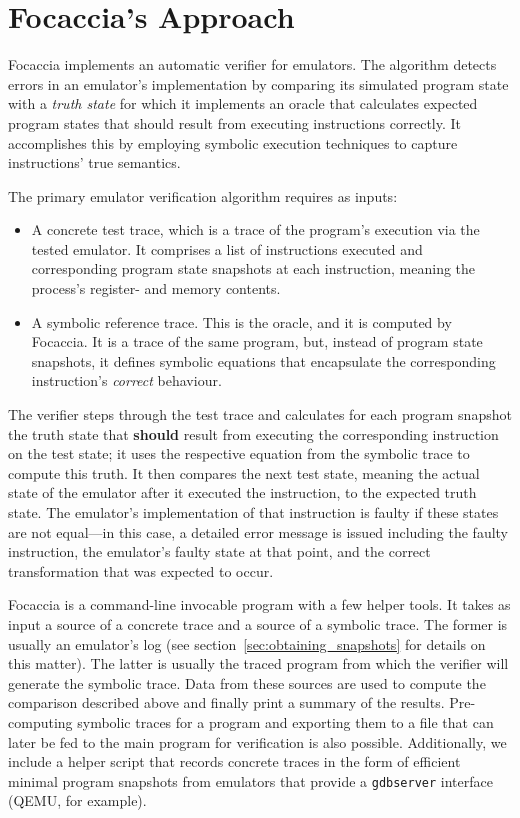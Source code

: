 \section{Focaccia's Approach}

Focaccia implements an automatic verifier for emulators. The algorithm detects errors in an emulator's implementation by
comparing its simulated program state with a \textit{truth state} for which it implements an oracle that calculates
expected program states that should result from executing instructions correctly. It accomplishes this by employing
symbolic execution techniques to capture instructions' true semantics.

The primary emulator verification algorithm requires as inputs:

\begin{itemize}
    \item A concrete test trace, which is a trace of the program's execution via the tested emulator. It comprises a
        list of instructions executed and corresponding program state snapshots at each instruction, meaning the
        process's register- and memory contents.
    \item A symbolic reference trace. This is the oracle, and it is computed by Focaccia. It is a trace of the same
        program, but, instead of program state snapshots, it defines symbolic equations that encapsulate the
        corresponding instruction's \textit{correct} behaviour.
\end{itemize}

The verifier steps through the test trace and calculates for each program snapshot the truth state that \textbf{should}
result from executing the corresponding instruction on the test state; it uses the respective equation from the symbolic
trace to compute this truth. It then compares the next test state, meaning the actual state of the emulator after it
executed the instruction, to the expected truth state. The emulator's implementation of that instruction is faulty if
these states are not equal---in this case, a detailed error message is issued including the faulty instruction, the
emulator's faulty state at that point, and the correct transformation that was expected to occur.

Focaccia is a command-line invocable program with a few helper tools. It takes as input a source of a concrete trace and
a source of a symbolic trace. The former is usually an emulator's log (see section~\ref{sec:obtaining_snapshots} for
details on this matter). The latter is usually the traced program from which the verifier will generate the symbolic
trace. Data from these sources are used to compute the comparison described above and finally print a summary of the
results. Pre-computing symbolic traces for a program and exporting them to a file that can later be fed to the main
program for verification is also possible. Additionally, we include a helper script that records concrete traces in the
form of efficient minimal program snapshots from emulators that provide a \texttt{gdbserver}
interface~\cite{Sourceware2024GdbRemoteProtocol} (QEMU, for example).

